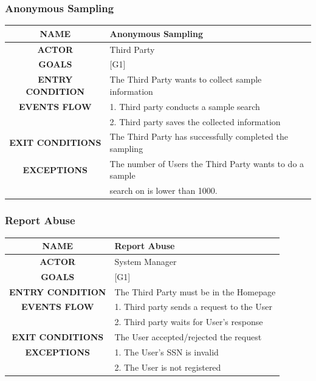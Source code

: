 \documentclass[12pt,a4paper]{article}
\begin{document}
	\subsubsection{Anonymous Sampling}
	\begin{center}
		\begin{tabular}{| c | l |}
			\hline
			\textbf{NAME} & Anonymous Sampling \\
			\hline
			\textbf{ACTOR} & Third Party \\
			\hline
			\textbf{GOALS} & [G1] \\
			\hline
			\textbf{ENTRY CONDITION} & The Third Party wants to collect sample information \\ \hline
			\textbf{EVENTS FLOW}  &
			1. Third party conducts a sample search\\
			&2. Third party saves the collected information\\
			\hline
			\textbf{EXIT CONDITIONS}  & The Third Party has successfully completed the sampling \\ \hline
			\textbf{EXCEPTIONS} & 
			The number of Users the Third Party wants to do a sample\\
			&search on is lower than 1000.\\
			\hline
		\end{tabular}
	\end{center}

	\subsubsection{Report Abuse}
	\begin{center}
		\begin{tabular}{| c | l |}
			\hline
			\textbf{NAME} & Report Abuse \\
			\hline
			\textbf{ACTOR} & System Manager \\
			\hline
			\textbf{GOALS} & [G1] \\
			\hline
			\textbf{ENTRY CONDITION} & The Third Party must be in the Homepage \\ \hline
			\textbf{EVENTS FLOW}  &
			1. Third party sends a request to the User\\
			&2. Third party waits for User's response\\
			\hline
			\textbf{EXIT CONDITIONS}  & The User accepted/rejected the request \\ \hline
			\textbf{EXCEPTIONS} & 
			1. The User's SSN is invalid\\
			&2. The User is not registered\\
			\hline
		\end{tabular}
	\end{center}
\end{document}
